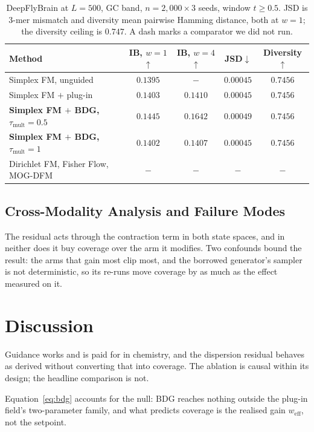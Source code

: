 \documentclass{article}
\newcommand{\weff}{w_{\mathrm{eff}}}
\begin{document}
\begin{table}[!htbp]
\centering\small
\caption{DeepFlyBrain at $L{=}500$, GC band, $n{=}2{,}000\times3$ seeds, window $t\ge0.5$. JSD is 3-mer mismatch and diversity mean pairwise Hamming distance, both at $w{=}1$; the diversity ceiling is $0.747$. A dash marks a comparator we did not run.}
\label{tab:m2}
\begin{tabular}{lcccc}
\toprule
Method & IB, $w{=}1$$\uparrow$ & IB, $w{=}4$$\uparrow$ & JSD$\downarrow$ & Diversity$\uparrow$\\
\midrule
Simplex FM, unguided & $0.1395$ & $-$ & $0.00045$ & $0.7456$\\
Simplex FM $+$ plug-in & $0.1403$ & $0.1410$ & $0.00045$ & $0.7456$\\
\textbf{Simplex FM $+$ BDG, $\tau_{\mathrm{mult}}{=}0.5$} & $0.1445$ & $0.1642$ & $0.00049$ & $0.7456$\\
\textbf{Simplex FM $+$ BDG, $\tau_{\mathrm{mult}}{=}1$} & $0.1402$ & $0.1407$ & $0.00045$ & $0.7456$\\
\midrule
Dirichlet FM, Fisher Flow, MOG-DFM \citep{stark2024dirichlet,davis2024fisher,chen2025multi} & $-$ & $-$ & $-$ & $-$\\
\bottomrule
\end{tabular}
\end{table}


\subsection{Cross-Modality Analysis and Failure Modes}\label{sec:failure}
The residual acts through the contraction term in both state spaces, and in neither does it buy coverage over the arm it modifies. Two confounds bound the result: the arms that gain most clip most, and the borrowed generator's sampler is not deterministic, so its re-runs move coverage by as much as the effect measured on it.

\section{Discussion}
Guidance works and is paid for in chemistry, and the dispersion residual behaves as derived without converting that into coverage. The ablation is causal within its design; the headline comparison is not.

Equation~\eqref{eq:bdg} accounts for the null: BDG reaches nothing outside the plug-in field's two-parameter family, and what predicts coverage is the realised gain $\weff$, not the setpoint.
\end{document}
